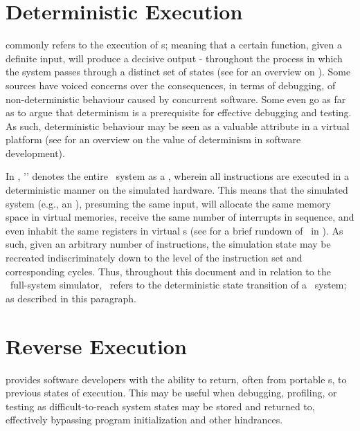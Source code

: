 \section{Deterministic Execution}
\label{sec:appendixa_deterministicexecution}
 commonly refers to the execution of \dvttermdeterministicalgorithm s; meaning that a certain function, given a definite input, will produce a decisive output - throughout the process in which the system passes through a distinct set of states (see  for an overview on ).
Some sources have voiced concerns over the consequences, in terms of debugging, of non-deterministic behaviour caused by concurrent software.
Some even go as far as to argue that determinism is a prerequisite for effective debugging and testing.
As such, deterministic behaviour may be seen as a valuable attribute in a virtual platform (see  for an overview on the value of determinism in software development).

In \dvttermsimics , '\dvttermdeterministicexecution ' denotes the entire \dvttermtarget\ system as a \dvttermdeterministicalgorithm , wherein all instructions are executed in a deterministic manner on the simulated hardware.
This means that the simulated system (e.g., an \dvttermos ), presuming the same input, will allocate the same memory space in virtual memories, receive the same number of interrupts in sequence, and even inhabit the same registers in virtual \dvttermcpu s (see  for a brief rundown of \dvttermdeterministicexecution\ in \dvttermsimics ).
As such, given an arbitrary number of instructions, the simulation state may be recreated indiscriminately down to the level of the instruction set and corresponding cycles.
Thus, throughout this document and in relation to the \dvttermsimics\ full-system simulator, \dvttermdeterministicexecution\ refers to the deterministic state transition of a \dvttermtarget\ system; as described in this paragraph.

\section{Reverse Execution}
\label{sec:appendixa_reverseexecution}
 provides software developers with the ability to return, often from portable \dvttermcheckpoint s, to previous states of execution.
This may be useful when debugging, profiling, or testing as difficult-to-reach system states may be stored and returned to, effectively bypassing program initialization and other hindrances.

